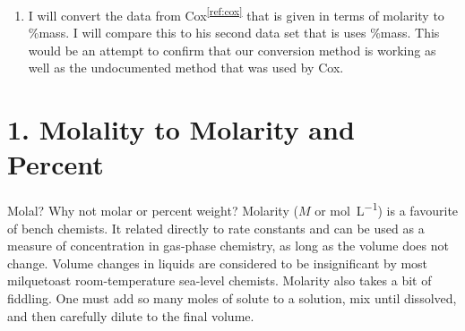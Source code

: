 \documentclass[]{tufte-handout}
\newcommand{\tss}[1]{\textsuperscript{#1}}
\begin{document}
\begin{enumerate}
\item I will convert the data from Cox\tss{\ref{ref:cox}} that is given in terms of molarity to \%mass. I will compare this to his second data set that is uses \%mass. This would be an attempt to confirm that our conversion method is working as well as the undocumented method that was used by Cox. 

\end{enumerate}

 


\section{1. Molality to Molarity and Percent}\label{sec:one}

Molal? Why not molar or percent weight? Molarity ($M$ or \unit{\mole\per\liter}) is a favourite of bench chemists. It related directly to rate constants and can be used as a measure of concentration in gas-phase chemistry, as long as the volume does not change. Volume changes in liquids are considered to be insignificant by most milquetoast room-temperature sea-level chemists. Molarity also takes a bit of fiddling. One must add so many moles of solute to a solution, mix until dissolved, and then carefully dilute to the final volume.
\end{document}

